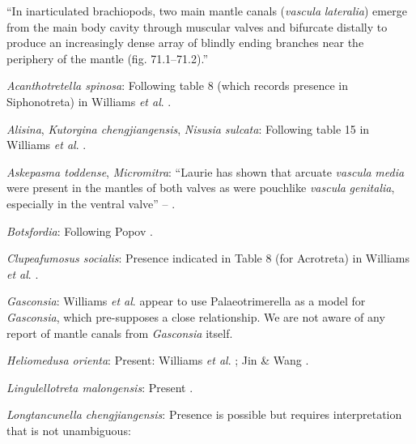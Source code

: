 \documentclass[openany]{book}
\theoremstyle{definition}
\theoremstyle{definition}
\theoremstyle{definition}
\theoremstyle{remark}
\begin{document}
``In inarticulated brachiopods, two main mantle canals (\emph{vascula}
\emph{lateralia}) emerge from the main body cavity through muscular
valves and bifurcate distally to produce an increasingly dense array of
blindly ending branches near the periphery of the mantle (fig.
71.1--71.2).''

\hypertarget{Acanthotretella_spinosa-coding-93}{}
\emph{Acanthotretella spinosa}: Following table 8 (which records
presence in Siphonotreta) in Williams \emph{et al}.
\citeyearpar{Williams2000LinguliformeaCraniiformea}.

\hypertarget{Alisina-coding-93}{}
\emph{Alisina}, \emph{Kutorgina chengjiangensis}, \emph{Nisusia
sulcata}: Following table 15 in Williams \emph{et al}.
\citeyearpar{Williams2000LinguliformeaCraniiformea}.

\hypertarget{Askepasma_toddense-coding-93}{}
\emph{Askepasma toddense}, \emph{Micromitra}: ``Laurie
\citeyearpar{Laurie1987Themusculature} has shown that arcuate
\emph{vascula} \emph{media} were present in the mantles of both valves
as were pouchlike \emph{vascula} \emph{genitalia}, especially in the
ventral valve'' -- \citet{Williams1997Introduction}.

\hypertarget{Botsfordia-coding-93}{}
\emph{Botsfordia}: Following Popov \citeyearpar{Popov1992TheCambrian}.

\hypertarget{Clupeafumosus_socialis-coding-93}{}
\emph{Clupeafumosus socialis}: Presence indicated in Table 8 (for
Acrotreta) in Williams \emph{et al}.
\citeyearpar{Williams2000LinguliformeaCraniiformea}.

\hypertarget{Gasconsia-coding-93}{}
\emph{Gasconsia}: Williams \emph{et al}. \citeyearpar[table
15]{Williams2000LinguliformeaCraniiformea} appear to use
Palaeotrimerella \citep[as drawn in][]{Williams1997Introduction} as a
model for \emph{Gasconsia}, which pre-supposes a close relationship. We
are not aware of any report of mantle canals from \emph{Gasconsia}
itself.

\hypertarget{Heliomedusa_orienta-coding-93}{}
\emph{Heliomedusa orienta}: Present: Williams \emph{et al}.
\citeyearpar{Williams2000LinguliformeaCraniiformea}; Jin \& Wang
\citeyearpar{Jin1992Revisionof}.

\hypertarget{Lingulellotreta_malongensis-coding-93}{}
\emph{Lingulellotreta malongensis}: Present
\citep{Williams2000LinguliformeaCraniiformea}.

\hypertarget{Longtancunella_chengjiangensis-coding-93}{}
\emph{Longtancunella chengjiangensis}: Presence is possible but requires
interpretation that is not unambiguous:
\end{document}
